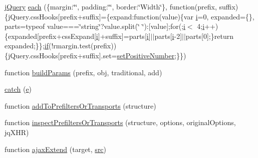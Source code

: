 \begin{DoxyCompactItemize}
\hyperlink{_scripts_2jquery-1_810_82_8js_a5e01048fbd3a30b44e8d491d8945c457}{j\+Query} \hyperlink{obj_2_release_2_package_2_package_tmp_2_scripts_2jquery-1_810_82_8js_a4d613a6d16c025ab901ff536b58f9ecd}{each} (\{margin\+:\char`\"{}\char`\"{}, padding\+:\char`\"{}\char`\"{}, border\+:\char`\"{}Width\char`\"{}\}, function(prefix, suffix)\{j\+Query.\+css\+Hooks\mbox{[}prefix+suffix\mbox{]}=\{expand\+:function(value)\{var \hyperlink{jquery_8unobtrusive-ajax_8min_8js_a84da5ff1aa6008a770fb28040f6b0569}{i}=0, expanded=\{\}, parts=typeof value===\char`\"{}string\char`\"{}?value.\+split(\char`\"{} \char`\"{})\+:\mbox{[}value\mbox{]};for(;\hyperlink{jquery_8unobtrusive-ajax_8min_8js_a84da5ff1aa6008a770fb28040f6b0569}{i}$<$ 4;\hyperlink{jquery_8unobtrusive-ajax_8min_8js_a84da5ff1aa6008a770fb28040f6b0569}{i}++)\{expanded\mbox{[}prefix+css\+Expand\mbox{[}\hyperlink{jquery_8unobtrusive-ajax_8min_8js_a84da5ff1aa6008a770fb28040f6b0569}{i}\mbox{]}+suffix\mbox{]}=parts\mbox{[}\hyperlink{jquery_8unobtrusive-ajax_8min_8js_a84da5ff1aa6008a770fb28040f6b0569}{i}\mbox{]}$\vert$$\vert$parts\mbox{[}\hyperlink{jquery_8unobtrusive-ajax_8min_8js_a84da5ff1aa6008a770fb28040f6b0569}{i}-\/2\mbox{]}$\vert$$\vert$parts\mbox{[}0\mbox{]};\}return expanded;\}\};\hyperlink{_scripts_2respond_8min_8js_a93851d60dd037a83509a1757b9ee7b66}{if}(!rmargin.\+test(prefix))\{j\+Query.\+css\+Hooks\mbox{[}prefix+suffix\mbox{]}.set=\hyperlink{_scripts_2jquery-1_810_82_8js_a049182834e8b4b2d7485cd919ed272d7}{set\+Positive\+Number};\}\})
\item 
function \hyperlink{obj_2_release_2_package_2_package_tmp_2_scripts_2jquery-1_810_82_8js_a3c4f3b337daa2444fa73ee856be5f9d8}{build\+Params} (prefix, obj, traditional, add)
\item 
\hyperlink{obj_2_release_2_package_2_package_tmp_2_scripts_2jquery-1_810_82_8js_a5bf45fc51bc0426586792b5f9cb95431}{catch} (\hyperlink{jquery_8unobtrusive-ajax_8min_8js_a1bbdb559c9d41205c42f84b233650eb3}{e})
\item 
function \hyperlink{obj_2_release_2_package_2_package_tmp_2_scripts_2jquery-1_810_82_8js_ae8bffbac8c6b2208e0ca37b475ec0b70}{add\+To\+Prefilters\+Or\+Transports} (structure)
\item 
function \hyperlink{obj_2_release_2_package_2_package_tmp_2_scripts_2jquery-1_810_82_8js_ac96b244aea80657fe2d6e3d2c1e8b622}{inspect\+Prefilters\+Or\+Transports} (structure, options, original\+Options, jq\+X\+H\+R)
\item 
function \hyperlink{obj_2_release_2_package_2_package_tmp_2_scripts_2jquery-1_810_82_8js_a113ade43cfd5328ebd5ccc84f45fe4de}{ajax\+Extend} (target, \hyperlink{_facebook_8js_a669962a32e24fe52ad2ad277d2037f70}{src})

\end{DoxyCompactItemize}
